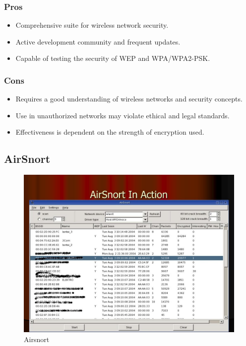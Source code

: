 \documentclass[11pt]{article}
\begin{document}
\subsubsection{Pros}
\begin{itemize}
	\item Comprehensive suite for wireless network security.
	\item Active development community and frequent updates.
	\item Capable of testing the security of WEP and WPA/WPA2-PSK.
\end{itemize}

\subsubsection{Cons}
\begin{itemize}
	\item Requires a good understanding of wireless networks and security concepts.
	\item Use in unauthorized networks may violate ethical and legal standards.
	\item Effectiveness is dependent on the strength of encryption used.
\end{itemize}

\subsection{AirSnort}

\begin{figure}[H]
	\centering
	\includegraphics[width=.95\textwidth]{airsnort/airsnort_6.jpg}
	\caption{Airsnort}
\end{figure}
\end{document}
